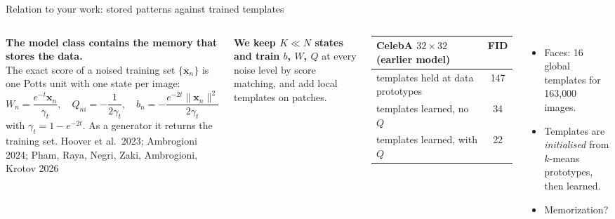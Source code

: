 \documentclass[aspectratio=169,10pt]{beamer}
\newcommand{\x}{\bm{x}}
\newcommand{\src}[1]{{\color{muted}\scriptsize #1}}
\begin{document}
\begin{frame}{Relation to your work: stored patterns against trained templates}
  \begin{columns}[T,onlytextwidth]
      \textbf{The model class contains the memory that stores the data.}\\[3pt]
      The exact score of a noised training set $\{\x_n\}$ is one Potts unit with one state
      per image:
      \[
        W_n=\frac{e^{-t}\x_n}{\gamma_t},\quad
        Q_{ni}=-\frac{1}{2\gamma_t},\quad
        b_n=-\frac{e^{-2t}\lVert\x_n\rVert^{2}}{2\gamma_t}
      \]
      with $\gamma_t=1-e^{-2t}$. As a generator it returns the training set.
      \src{Hoover et al.\ 2023; Ambrogioni 2024; Pham, Raya, Negri, Zaki, Ambrogioni, Krotov 2026}

      \vspace{0.25cm}
      \textbf{We keep $K\ll N$ states and train $b$, $W$, $Q$} at every noise level by score
      matching, and add local templates on patches.
      \vspace{0.1cm}
      \small
      \begin{tabular}{@{}lc@{}}
        \toprule
        CelebA $32\times32$ \src{(earlier model)} & FID \\
        \midrule
        templates held at data prototypes & 147 \\
        templates learned, no $Q$ & 34 \\
        templates learned, with $Q$ & 22 \\
        \bottomrule
      \end{tabular}

      \vspace{0.4cm}
      \begin{itemize}\setlength{\itemsep}{5pt}
        \item Faces: 16 global templates for 163{,}000 images.
        \item Templates are \emph{initialised} from $k$-means prototypes, then learned.
        \item Memorization?
      \end{itemize}
  \end{columns}
\end{frame}
\end{document}
